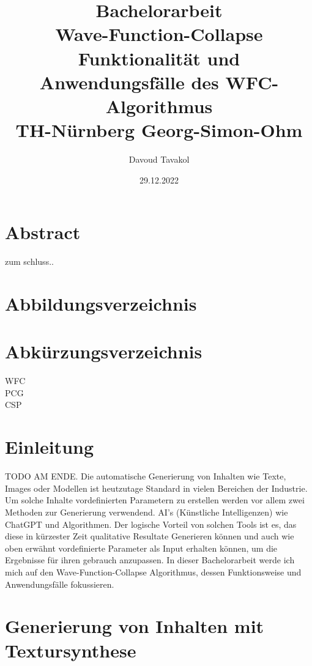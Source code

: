 \documentclass[12pt]{report}
\title{
{Bachelorarbeit}\\
{\vspace{10mm}}
{\small Wave-Function-Collapse}\\
{\small Funktionalität und Anwendungsfälle des WFC-Algorithmus}\\
{\small TH-Nürnberg Georg-Simon-Ohm}\\
}
\author{Davoud Tavakol}
\date{29.12.2022}
\begin{document}
\maketitle

{\let\clearpage\relax\chapter*{Abstract}}

zum schluss..

\tableofcontents

{\let\clearpage\relax\chapter{Abbildungsverzeichnis}}

{\let\clearpage\relax\chapter{Abkürzungsverzeichnis}}

WFC\\
PCG\\
CSP\\

{\let\clearpage\relax\chapter{Einleitung}}

TODO AM ENDE.
Die automatische Generierung von Inhalten wie Texte, Images oder Modellen ist heutzutage Standard in vielen Bereichen der Industrie.
Um solche Inhalte vordefinierten Parametern zu erstellen werden vor allem zwei Methoden zur Generierung verwendend.
AI's {(Künstliche Intelligenzen)} wie ChatGPT und Algorithmen.
Der logische Vorteil von solchen Tools ist es, das diese in kürzester Zeit qualitative Resultate Generieren können und auch wie oben erwähnt vordefinierte Parameter als Input erhalten können,
um die Ergebnisse für ihren gebrauch anzupassen.
In dieser Bachelorarbeit werde ich mich auf den Wave-Function-Collapse Algorithmus, dessen Funktionsweise und Anwendungsfälle fokussieren.


{\let\clearpage\relax\chapter{Generierung von Inhalten mit Textursynthese}}
\end{document}
